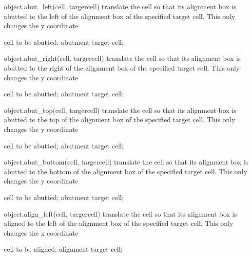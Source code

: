 \begin{APIfunc}{object.abut\_left(cell, targercell)}
    translate the cell so that its alignment box is abutted to the left of the alignment box of the specified target cell. This only changes the y coordinate
    \begin{APIparameters}
            cell to be abutted;
            abutment target cell;
    \end{APIparameters}
\end{APIfunc}
\begin{APIfunc}{object.abut\_right(cell, targercell)}
    translate the cell so that its alignment box is abutted to the right of the alignment box of the specified target cell. This only changes the y coordinate
    \begin{APIparameters}
            cell to be abutted;
            abutment target cell;
    \end{APIparameters}
\end{APIfunc}
\begin{APIfunc}{object.abut\_top(cell, targercell)}
    translate the cell so that its alignment box is abutted to the top of the alignment box of the specified target cell. This only changes the y coordinate
    \begin{APIparameters}
            cell to be abutted;
            abutment target cell;
    \end{APIparameters}
\end{APIfunc}
\begin{APIfunc}{object.abut\_bottom(cell, targercell)}
    translate the cell so that its alignment box is abutted to the bottom of the alignment box of the specified target cell. This only changes the y coordinate
    \begin{APIparameters}
            cell to be abutted;
            abutment target cell;
    \end{APIparameters}
\end{APIfunc}
\begin{APIfunc}{object.align\_left(cell, targercell)}
    translate the cell so that its alignment box is aligned to the left of the alignment box of the specified target cell. This only changes the x coordinate
    \begin{APIparameters}
            cell to be aligned;
            alignment target cell;
    \end{APIparameters}
\end{APIfunc}
